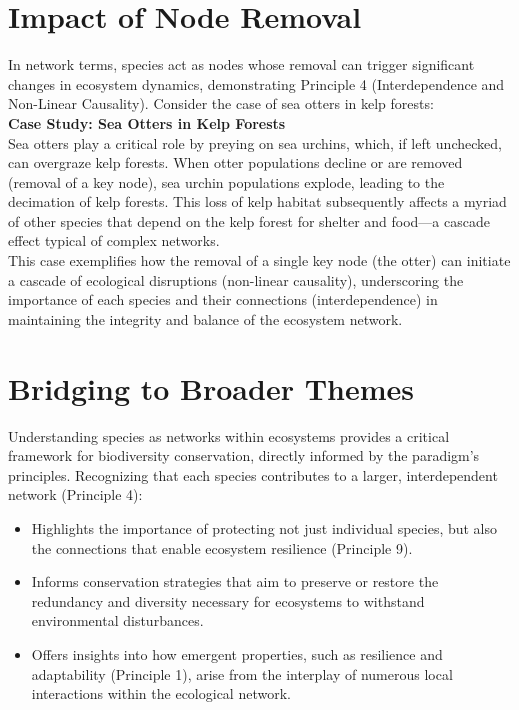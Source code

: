 \documentclass[12pt,openany]{book}
\begin{document}
\section{Impact of Node Removal}
In network terms, species act as nodes whose removal can trigger significant changes in ecosystem dynamics, demonstrating Principle 4 (Interdependence and Non-Linear Causality). Consider the case of sea otters in kelp forests:\\[1ex]
\textbf{Case Study: Sea Otters in Kelp Forests}\\[1ex]
Sea otters play a critical role by preying on sea urchins, which, if left unchecked, can overgraze kelp forests. When otter populations decline or are removed (removal of a key node), sea urchin populations explode, leading to the decimation of kelp forests. This loss of kelp habitat subsequently affects a myriad of other species that depend on the kelp forest for shelter and food—a cascade effect typical of complex networks.\\[1ex]
This case exemplifies how the removal of a single key node (the otter) can initiate a cascade of ecological disruptions (non-linear causality), underscoring the importance of each species and their connections (interdependence) in maintaining the integrity and balance of the ecosystem network. %

\section{Bridging to Broader Themes}
Understanding species as networks within ecosystems provides a critical framework for biodiversity conservation, directly informed by the paradigm's principles. Recognizing that each species contributes to a larger, interdependent network (Principle 4):
\begin{itemize}
    \item Highlights the importance of protecting not just individual species, but also the connections that enable ecosystem resilience (Principle 9).
    \item Informs conservation strategies that aim to preserve or restore the redundancy and diversity necessary for ecosystems to withstand environmental disturbances.
    \item Offers insights into how emergent properties, such as resilience and adaptability (Principle 1), arise from the interplay of numerous local interactions within the ecological network.
\end{itemize} %
\end{document}
